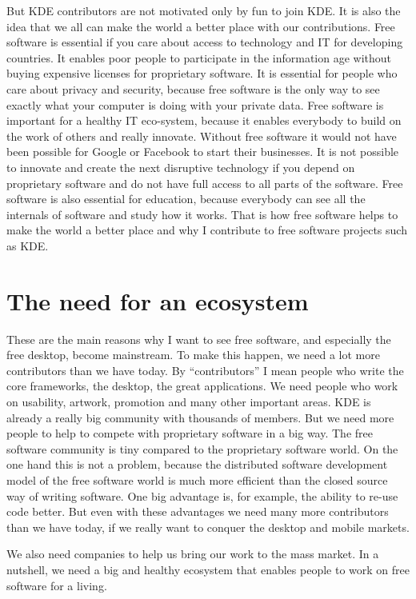 But KDE contributors are not motivated only by fun to join KDE. It is also the
idea that we all can make the world a better place with our contributions. Free
software is essential if you care about access to technology and IT for
developing countries. It enables poor people to participate in the information
age without buying expensive licenses for proprietary software. It is
essential for people who care about privacy and security, because free software
is the only way to see  exactly what your computer is doing with your private
data. Free software is important for a healthy IT eco-system, because it enables
everybody to build on the work of others and really innovate. Without free
software it would not have been possible for Google or Facebook to start their
businesses. It is not possible to innovate and create the next disruptive
technology if you depend on proprietary software and do not have full access to
all parts of the software.
Free software is also essential for education, because everybody can see all the
internals of software and study how it works. That is how free software helps to
make the world a better place and why I contribute to free software projects
such as KDE. 

\section*{The need for an ecosystem}

These are the main reasons why I want to see free software, and especially the
free desktop, become mainstream. To make this happen, we need a lot more
contributors than we have today. By ``contributors'' I mean people who write the
core frameworks, the desktop, the great applications. We need people who work on
usability, artwork, promotion and many other important areas. KDE is already a
really big community with thousands of members. But we need more people to help 
to compete with proprietary software in a big way. The free software community
is tiny compared to the proprietary software world. On the one hand this is not
a problem, because the distributed software development model of the free
software world is much more efficient than the closed source way of writing
software. One big advantage is, for example, the ability to re-use code better.
But even with these advantages we need many more contributors than we have
today, if we really want to conquer the desktop and mobile markets.

We also need companies to help us bring our work to the mass market. In a
nutshell, we need a big and healthy ecosystem that enables people to work on
free software for a living.


